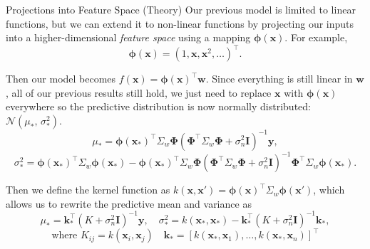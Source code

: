 \documentclass[9pt]{beamer}
\begin{document}
\begin{frame}{Projections into Feature Space (Theory)}
	Our previous model is limited to linear functions, but we can extend it to non-linear functions by projecting our inputs into a higher-dimensional \emph{feature space} using a mapping $\boldsymbol{\phi}(\mathbf{x})$. For example, 
	\[
		\boldsymbol{\phi}(\mathbf{x}) = (1, \mathbf{x}, \mathbf{x}^2, \ldots)^\top.
	\]

	Then our model becomes $f(\mathbf{x}) = \boldsymbol{\phi}(\mathbf{x})^\top \mathbf{w}$. Since everything is still linear in $\mathbf{w}$, all of our previous results still hold, we just need to replace $\mathbf{x}$ with $\boldsymbol{\phi}(\mathbf{x})$ everywhere so the predictive distribution is now normally distributed:
	$\mathcal{N}\!\left( \mu_*, \, \sigma_*^2 \right)$.
	\[
	\mu_* =
	\boldsymbol{\phi}(\mathbf{x}_*)^\top
	\Sigma_w
	\boldsymbol{\Phi}
	\left(
	\boldsymbol{\Phi}^\top \Sigma_w \boldsymbol{\Phi}
	+ \sigma_n^2 \mathbf{I}
	\right)^{-1}
	\mathbf{y},
	\]
	\[
	\sigma_*^2 =
	\boldsymbol{\phi}(\mathbf{x}_*)^\top
	\Sigma_w
	\boldsymbol{\phi}(\mathbf{x}_*)
	-
	\boldsymbol{\phi}(\mathbf{x}_*)^\top
	\Sigma_w
	\boldsymbol{\Phi}
	\left(
	\boldsymbol{\Phi}^\top \Sigma_w \boldsymbol{\Phi}
	+ \sigma_n^2 \mathbf{I}
	\right)^{-1}
	\boldsymbol{\Phi}^\top
	\Sigma_w
	\boldsymbol{\phi}(\mathbf{x}_*).
	\]

Then we define the kernel function as 
$k(\mathbf{x}, \mathbf{x}') = \boldsymbol{\phi}(\mathbf{x})^\top \Sigma_w \boldsymbol{\phi}(\mathbf{x}')$,
which allows us to rewrite the predictive mean and variance as
\[
	\mu_* =
	\mathbf{k}_*^\top
	\left( K + \sigma_n^2 \mathbf{I} \right)^{-1}
	\mathbf{y},
	\quad
	\sigma_*^2 =
	k(\mathbf{x}_*, \mathbf{x}_*)
	-
	\mathbf{k}_*^\top
	\left( K + \sigma_n^2 \mathbf{I} \right)^{-1}
	\mathbf{k}_*,
\]
\[
	\text{where }
	K_{ij} = k(\mathbf{x}_i, \mathbf{x}_j)
	\quad
	\mathbf{k}_* = [k(\mathbf{x}_*, \mathbf{x}_1), \ldots, k(\mathbf{x}_*, \mathbf{x}_n)]^\top
\]
\end{frame}
\end{document}
